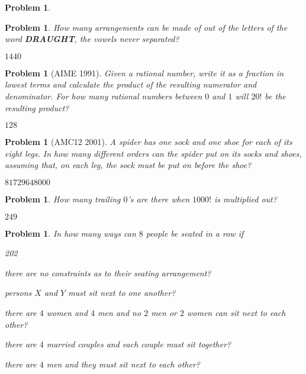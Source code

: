 \documentclass[11pt, openany]{book}
\theoremstyle{change} \theoremheaderfont{\blue\sffamily\bfseries}
\newtheorem{pro}[thm]{Problem}
\theoremstyle{nonumberplain} \theoremheaderfont{\sffamily\bfseries}
\newcommand{\í}{\'{\i}}
\begin{document}
\begin{multicols}{2}
\begin{pro}
\begin{answer}
\end{answer}
     \end{pro}
           \begin{pro}
How many arrangements can be made of out of the letters of the word
{\bf DRAUGHT}, the vowels never separated?
\begin{answer}$1440$
\end{answer}
   \end{pro}
     \begin{pro}[AIME 1991]
 Given a rational number, write it as a fraction in lowest terms
and calculate the product of the resulting numerator and
denominator. For how many rational numbers between $0$ and $1$ will
$20!$ be the resulting product?
\begin{answer}$128$
\end{answer}
   \end{pro}
          \begin{pro}[AMC12 2001]
 A spider has one sock and one shoe for each of its eight legs.
In how many different orders can the spider put on its socks and
shoes, assuming that, on each leg, the sock must be put on before
the shoe?
\begin{answer}$81729648000$
\end{answer}
  \end{pro}
    \begin{pro}
How many trailing $0$'s are there when $1000!$ is multiplied out?
\begin{answer}$249 $
\end{answer}
\end{pro}


\begin{pro}
In how many ways can $8$ people be seated in a row if
\begin{dingautolist}{202}
\item  there are no constraints as to their seating arrangement?
\item persons $X$ and $Y$ must sit next to one another? \item
there are $4$ women and $4$ men and no $2$ men or $2$ women can sit
next to each other? \item there are $4$ married couples and each
couple must sit together? \item
there are $4$ men and they must sit next to each other?\\


\end{dingautolist}
\end{pro}
\end{multicols}
\end{document}
